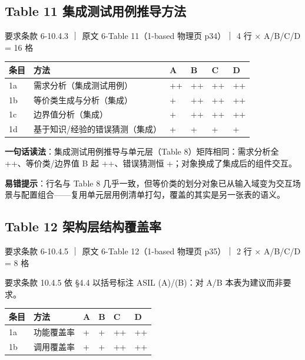 \subsection{Table 11 集成测试用例推导方法}

要求条款 6-10.4.3 ｜ 原文 6-Table 11（1-based 物理页 p34）｜ 4 行 \(\times\) A/B/C/D = 16 格

\begin{center}
\begingroup\small
\setlength{\tabcolsep}{4pt}
\begin{tabularx}{\linewidth}{@{}XXXXXX@{}}
\toprule
条目 & 方法 & A & B & C & D \\
\midrule
1a & 需求分析（集成测试用例） & ++ & ++ & ++ & ++ \\
1b & 等价类生成与分析（集成） & + & ++ & ++ & ++ \\
1c & 边界值分析（集成） & + & ++ & ++ & ++ \\
1d & 基于知识/经验的错误猜测（集成） & + & + & + & + \\
\bottomrule
\end{tabularx}
\endgroup
\end{center}

\textbf{一句话读法}：集成测试用例推导与单元层（Table 8）矩阵相同：需求分析全 ++、等价类/边界值 B 起 ++、错误猜测恒 +；对象换成了集成后的组件交互。

\textbf{易错提示}：行名与 Table 8 几乎一致，但等价类的划分对象已从输入域变为交互场景与配置组合——复用单元层用例清单打勾，覆盖的其实是另一张表的语义。

\subsection{Table 12 架构层结构覆盖率}

要求条款 6-10.4.5 ｜ 原文 6-Table 12（1-based 物理页 p35）｜ 2 行 \(\times\) A/B/C/D = 8 格

\begin{noteblock}
要求条款 10.4.5 依 §4.4 以括号标注 ASIL (A)/(B)：对 A/B 本表为建议而非要求。
\end{noteblock}

\begin{center}
\begingroup\small
\setlength{\tabcolsep}{4pt}
\begin{tabularx}{\linewidth}{@{}XXXXXX@{}}
\toprule
条目 & 方法 & A & B & C & D \\
\midrule
1a & 功能覆盖率 & + & + & ++ & ++ \\
1b & 调用覆盖率 & + & + & ++ & ++ \\
\bottomrule
\end{tabularx}
\endgroup
\end{center}

